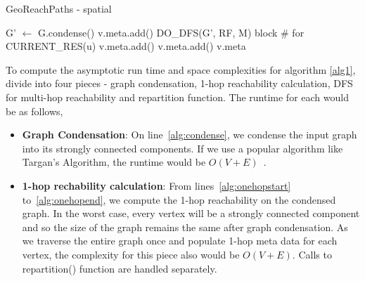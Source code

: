 {\begin{algorithm}[t]
\caption{GeoReachPaths - spatial}
\begin{scriptsize}
\label{alg1}
\begin{algorithmic}[1]
  \State G' $\gets$ G.condense() \label{alg:condense}
    \label{alg:onehopstart}
	  	\State v.meta.add()
	  \EndFor
	  \State {}
  \EndFor \label{alg:onehopend}
  \State DO\_DFS(G', RF, M)   \label{alg:dfs}
\EndFunction
{}
	\State \Return block \# for CURRENT\_RES(u)
\EndFunction
{}
		\State {}
	\EndWhile
\EndFunction
{}
		\State v.meta.add()
		\State {}
	\EndFor
\EndFunction
{}
		\State v.meta.add()
	\EndFor
	\State \Return v.meta
\EndFunction
\end{algorithmic}
\end{scriptsize}
\end{algorithm}

To compute the asymptotic run time and space complexities for algorithm \ref{alg1}, divide into four pieces - graph condensation, 1-hop reachability calculation, DFS for multi-hop reachability and repartition function. The runtime for each would be as follows,
\begin{itemize}

  \item \textbf{Graph Condensation}: On line~\ref{alg:condense}, we condense the input graph into its strongly connected components. If we use a popular algorithm like Targan's Algorithm, the runtime would be $O(V + E)$~\cite{R1972}.

  \item \textbf{1-hop rechability calculation}: From lines~\ref{alg:onehopstart} to~\ref{alg:onehopend}, we compute the 1-hop reachability on the condensed graph. In the worst case, every vertex will be a strongly connected component and so the size of the graph remains the same after graph condensation. As we traverse the entire graph once and populate 1-hop meta data for each vertex, the complexity for this piece also would be $O(V + E)$. Calls to repartition() function are handled separately.


\end{itemize}}
